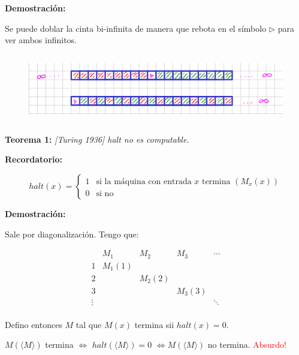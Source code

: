 \documentclass{article}
\begin{document}
\begin{flushleft}
  \textbf{\textcolor{Mulberry}{Demostración:}}

  Se puede doblar la cinta bi-infinita de manera que rebota en el símbolo $\triangleright$ para 
  ver ambos infinitos.

  \begin{figure}[h] 
    \centering 
    \includegraphics[width=13cm, height=3cm]{./imagenes/biinfinita_a_infinita.png}
  \end{figure}
\end{flushleft}

\pagebreak

\begin{flushleft}
  \textbf{Teorema 1:}
  \textit{[Turing 1936] halt no es computable.}
\end{flushleft}

\begin{flushleft}
  \textbf{\textcolor{OliveGreen}{Recordatorio:}}

  \[
    halt(x) = 
    \begin{cases}
    1 & \text{si la máquina con entrada } x \text{ termina } (M_x(x)) \\
    0 & \text{si no}
    \end{cases}
  \]

  \textbf{\textcolor{Mulberry}{Demostración:}}

  Sale por diagonalización. Tengo que:
  
  \[
    \begin{array}{c|cccc}
    & M_1 & M_2 & M_3 & \cdots \\
    \hline
    1 & M_1(1) &  &  & \\
    2 &  & M_2(2) &  & \\
    3 &  &  & M_3(3) & \\
    \vdots &  &  &  & \ddots \\
    \end{array}
  \]

  Defino entonces $M$ tal que $M(x)$ termina sii $halt(x) = 0$.

  $M(\langle M \rangle)$ termina $\iff$ $halt(\langle M \rangle) = 0$ $ \iff M(\langle M \rangle)$ 
  no termina. \textcolor{Red}{Absurdo!}
\end{flushleft}
\end{document}
